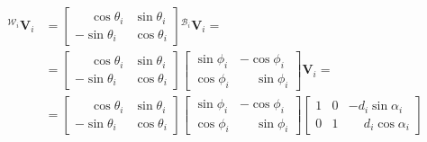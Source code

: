 \documentclass[11pt,a4paper]{article}
\newcommand{\vect}[1]{\bm{#1}}       %
\newcommand{\frameBi}{\mathcal{B}_i}
\newcommand{\frameWi}{\mathcal{W}_i}
\begin{document}
\begin{equation}
    \begin{aligned}
        {}^{\frameWi} \vect{V}_i & = \begin{bmatrix}
                                         \phantom{-}\cos\theta_i & \sin\theta_i \\
                                         -\sin\theta_i           & \cos\theta_i
                                     \end{bmatrix} {}^{\frameBi} \vect{V}_i =                                                                                                \\
                                 & = \begin{bmatrix}
                                         \phantom{-}\cos\theta_i & \sin\theta_i \\
                                         -\sin\theta_i           & \cos\theta_i
                                     \end{bmatrix} \begin{bmatrix}
                                                       \sin\phi_i & -\cos\phi_i           \\
                                                       \cos\phi_i & \phantom{-}\sin\phi_i
                                                   \end{bmatrix} \vect{V}_i =                                                                                        \\
                                 & = \begin{bmatrix}
                                         \phantom{-}\cos\theta_i & \sin\theta_i \\
                                         -\sin\theta_i           & \cos\theta_i
                                     \end{bmatrix} \begin{bmatrix}
                                                       \sin\phi_i & -\cos\phi_i           \\
                                                       \cos\phi_i & \phantom{-}\sin\phi_i
                                                   \end{bmatrix}\begin{bmatrix}
                                                                    1 & 0 & -d_{i} \sin\alpha_i           \\
                                                                    0 & 1 & \phantom{-}d_{i} \cos\alpha_i

\end{bmatrix}
\end{aligned}
\end{equation}
\end{document}
